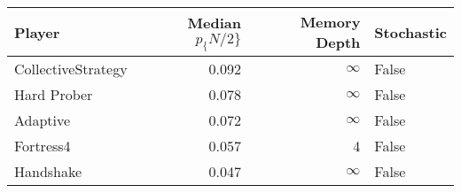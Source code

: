 \begin{tabular}{lrrl}
\toprule
             Player &  Median $p_\{N/2\}$ &  Memory Depth & Stochastic \\
\midrule
 CollectiveStrategy &             0.092 &            \(\infty\) &      False \\
        Hard Prober &             0.078 &            \(\infty\) &      False \\
           Adaptive &             0.072 &            \(\infty\) &      False \\
          Fortress4 &             0.057 &             4 &      False \\
          Handshake &             0.047 &            \(\infty\) &      False \\
\bottomrule
\end{tabular}
